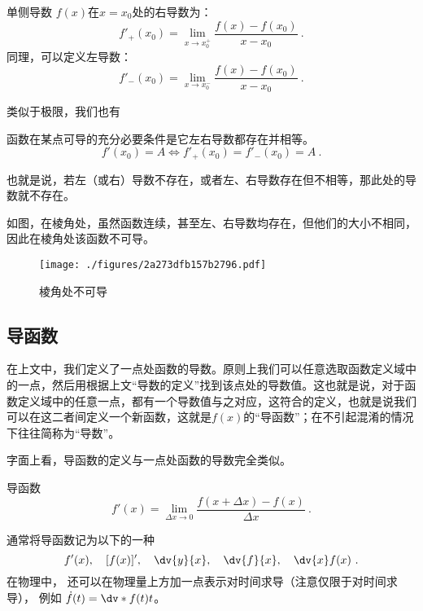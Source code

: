 \begin{definition}{单侧导数}\label{def_Der_1}
$f(x)$在$x=x_0$处的右导数为：
\begin{equation}
f'_+(x_0) = \lim_{x\to x_0^+} \frac{f(x)-f(x_0)}{x-x_0}~.
\end{equation}
同理，可以定义左导数：
\begin{equation}
f'_-(x_0) = \lim_{x\to x_0^-} \frac{f(x)-f(x_0)}{x-x_0}~.
\end{equation}
\end{definition}

类似于极限，我们也有
\begin{theorem}{}
函数在某点可导的充分必要条件是它左右导数都存在并相等。
$$f'(x_0)=A\Longleftrightarrow f'_+(x_0)=f'_-(x_0)=A~.$$

也就是说，若左（或右）导数不存在，或者左、右导数存在但不相等，那此处的导数就不存在。
\end{theorem}

\begin{example}{}
如图，在棱角处，虽然函数连续，甚至左、右导数均存在，但他们的大小不相同，因此在棱角处该函数不可导。
\begin{figure}[ht]
\centering
\texttt{[image: ./figures/2a273dfb157b2796.pdf]}
\caption{棱角处不可导} \label{fig_Der_21}
\end{figure}


\end{example}
\subsection{导函数}
在上文中，我们定义了一点处函数的导数。原则上我们可以任意选取函数定义域中的一点，然后用根据上文“导数的定义”找到该点处的导数值。这也就是说，对于函数定义域中的任意一点，都有一个导数值与之对应，这符合的定义，也就是说我们可以在这二者间定义一个新函数，这就是$f(x)$的“导函数”；在不引起混淆的情况下往往简称为“导数”。

字面上看，导函数的定义与一点处函数的导数完全类似。
\begin{definition}{导函数}
\begin{equation}
f'(x)=\lim_{\Delta x \to 0}\frac{f(x+\Delta x)-f(x)}{\Delta x}~.
\end{equation}
\end{definition}

通常将导函数记为以下的一种%
\begin{equation}\label{eq_Der_1}
f'(x),\quad [f(x)]',\quad \dv{y}{x},\quad \dv{f}{x},\quad \dv{x}f(x)~.
\end{equation}
在物理中， 还可以在物理量上方加一点表示对时间求导（注意仅限于对时间求导）， 例如 $\dot f(t) = \dv*{f(t)}{t}$。

